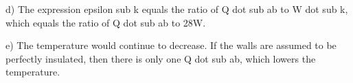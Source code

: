 d) The expression epsilon sub k equals the ratio of Q dot sub ab to W dot sub k, which equals the ratio of Q dot sub ab to 28W.

e) The temperature would continue to decrease. If the walls are assumed to be perfectly insulated, then there is only one Q dot sub ab, which lowers the temperature.
